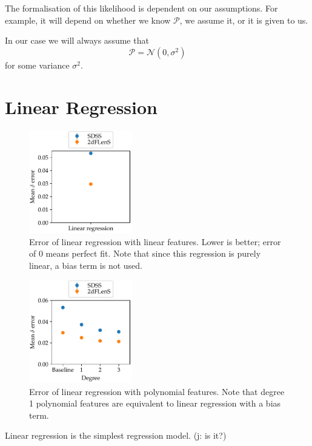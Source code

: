 \documentclass[11pt,twoside]{report}
\newcommand\cN{\mathcal{N}}
\newcommand\cP{\mathcal{P}}
\newcommand\jakub[1]{{\color{red}(j: #1)}}
\begin{document}
The formalisation of this likelihood is dependent on our assumptions. For example, it will depend on whether we know $\cP$, we assume it, or it is given to us.

In our case we will always assume that \[
    \cP = \cN(0, \sigma^2)
\] for some variance $\sigma^2$.

\section{Linear Regression}

  \begin{figure}
    \centering
    \includegraphics[width=0.4\textwidth]{linreg_plain.pdf}
    \caption{Error of linear regression with linear features. Lower is better; error of $0$ means perfect fit. Note that since this regression is purely linear, a bias term is not used.}
    \label{fig:linreg_plain}
  \end{figure}

  \begin{figure}
    \centering
    \includegraphics[width=0.4\textwidth]{linreg_polynomial.pdf}
    \caption{Error of linear regression with polynomial features. Note that degree 1 polynomial features are equivalent to linear regression with a bias term.}
    \label{fig:linreg_polynomial}
  \end{figure}

Linear regression is the simplest regression model. \jakub{is it?}
\end{document}
